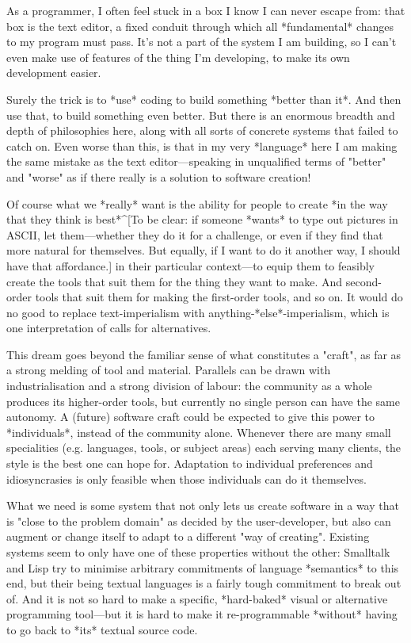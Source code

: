 {As a programmer, I often feel stuck in a box I know I can never escape from: that box is the text editor, a fixed conduit through which all *fundamental* changes to my program must pass. It's not a part of the system I am building, so I can't even make use of features of the thing I'm developing, to make its own development easier.

Surely the trick is to *use* coding to build something *better than it*. And then use that, to build something even better. But there is an enormous breadth and depth of philosophies here, along with all sorts of concrete systems that failed to catch on. Even worse than this, is that in my very *language* here I am making the same mistake as the text editor---speaking in unqualified terms of "better" and "worse" as if there really is a \OSFA{} solution to software creation!

Of course what we *really* want is the ability for people to create *in the way that they think is best*^[To be clear: if someone *wants* to type out pictures in ASCII, let them---whether they do it for a challenge, or even if they find that more natural for themselves. But equally, if I want to do it another way, I should have that affordance.] in their particular context---to equip them to feasibly create the tools that suit them for the thing they want to make. And second-order tools that suit them for making the first-order tools, and so on. It would do no good to replace text-imperialism with anything-*else*-imperialism, which is one interpretation of calls for alternatives.

This dream goes beyond the familiar sense of what constitutes a "craft", as far as a strong melding of tool and material. Parallels can be drawn with industrialisation and a strong division of labour: the community as a whole produces its higher-order tools, but currently no single person can have the same autonomy. A (future) software craft could be expected to give this power to *individuals*, instead of the community alone. Whenever there are many small specialities (e.g. languages, tools, or subject areas) each serving many clients, the \OSFA{} style is the best one can hope for. Adaptation to individual preferences and idiosyncrasies is only feasible when those individuals can do it themselves.

What we need is some system that not only lets us create software in a way that is "close to the problem domain" as decided by the user-developer, but also can augment or change itself to adapt to a different "way of creating". Existing systems seem to only have one of these properties without the other: Smalltalk and Lisp try to minimise arbitrary commitments of language *semantics* to this end, but their being textual languages is a fairly tough commitment to break out of. And it is not so hard to make a specific, *hard-baked* visual or alternative programming tool---but it is hard to make it re-programmable *without* having to go back to *its* textual source code.

}
